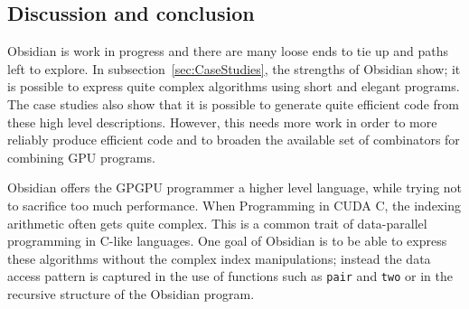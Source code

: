 \subsection{Discussion and conclusion}

Obsidian is work in progress and there are many loose ends to tie up and 
paths left to explore. In subsection~\ref{sec:CaseStudies}, the 
strengths of Obsidian show; it is possible to express quite complex algorithms
using short and elegant programs. The case studies also show that it is possible
to generate quite efficient code from these high level descriptions. However, 
this needs more work in order to more reliably produce efficient code and
to broaden the available set of combinators for combining GPU programs.


 


 

Obsidian offers the GPGPU programmer a higher level language, while trying 
not to sacrifice too much performance. When Programming in CUDA C, the indexing
arithmetic often gets quite complex. This is a common trait of data-parallel 
programming in C-like languages. One goal of Obsidian is to be able to express 
these algorithms without the complex index manipulations; instead the data 
access pattern is captured in the use of functions such as {\tt pair} and 
{\tt two} or in the recursive structure of the Obsidian program. 


